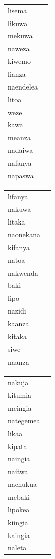 \documentclass[output=paper,colorlinks,citecolor=brown,
]{langscibook}
\begin{document}
\begin{table}
	\lsptoprule
\begin{minipage}[t]{.24\textwidth}
\begin{tabular}{ll} 
lisema \\ 
likuwa\\
mekuwa \\ 
naweza \\ 
			kiwemo \\ 
lianza \\ 
naendelea \\ 
litoa \\ 
weze \\ 
kawa \\ 
meanza \\ 
nadaiwa \\ 
nafanya \\ 
napaswa \\ 
\end{tabular}
\end{minipage}
\begin{minipage}[t]{.24\textwidth}
\begin{tabular}{ll} 
lifanya \\ 
nakuwa \\ 
litaka \\ 
naonekana \\ 
kifanya \\ 
natoa \\ 
nakwenda \\ 
baki \\ 
lipo \\ 
nazidi \\ 
kaanza \\ 
kitaka \\ 
siwe \\ 
naanza \\ 

\end{tabular}
\end{minipage}
\begin{minipage}[t]{.24\textwidth}
\begin{tabular}{ll} 

nakuja \\ 
kitumia \\ 
meingia \\ 
nategemea \\ 
likaa \\ 
kipata \\ 
naingia \\ 
naitwa \\ 
nachukua \\ 
mebaki \\ 
lipokea \\ 
kiingia \\ 
kaingia \\ 
naleta \\ 
\end{tabular}
\end{minipage}
\begin{minipage}[t]{.24\textwidth}
\begin{tabular}{ll} 


\end{tabular}
\end{minipage}
\end{table}
\end{document}
